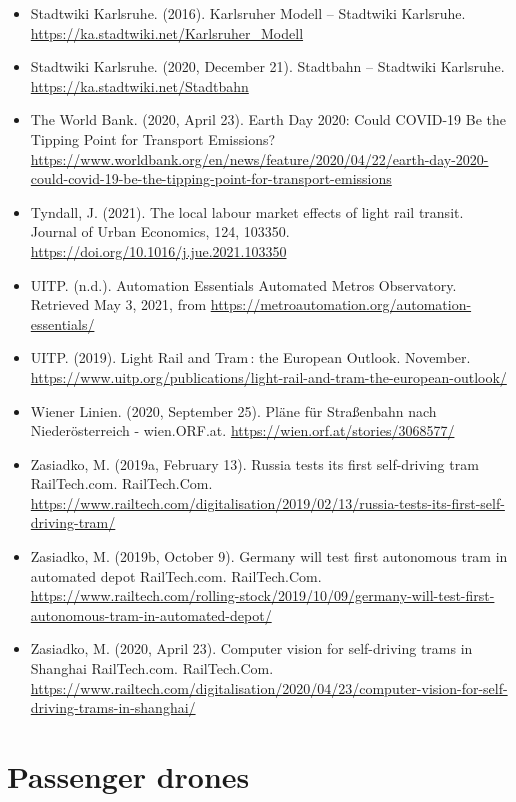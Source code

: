\documentclass[
]{book}
\begin{document}
\begin{itemize}
\item
  Stadtwiki Karlsruhe. (2016). Karlsruher Modell -- Stadtwiki Karlsruhe. \url{https://ka.stadtwiki.net/Karlsruher_Modell}
\item
  Stadtwiki Karlsruhe. (2020, December 21). Stadtbahn -- Stadtwiki Karlsruhe. \url{https://ka.stadtwiki.net/Stadtbahn}
\item
  The World Bank. (2020, April 23). Earth Day 2020: Could COVID-19 Be the Tipping Point for Transport Emissions? \url{https://www.worldbank.org/en/news/feature/2020/04/22/earth-day-2020-could-covid-19-be-the-tipping-point-for-transport-emissions}
\item
  Tyndall, J. (2021). The local labour market effects of light rail transit. Journal of Urban Economics, 124, 103350. \url{https://doi.org/10.1016/j.jue.2021.103350}
\item
  UITP. (n.d.). Automation Essentials \textbar{} Automated Metros Observatory. Retrieved May 3, 2021, from \url{https://metroautomation.org/automation-essentials/}
\item
  UITP. (2019). Light Rail and Tram\,: the European Outlook. November. \url{https://www.uitp.org/publications/light-rail-and-tram-the-european-outlook/}
\item
  Wiener Linien. (2020, September 25). Pläne für Straßenbahn nach Niederösterreich - wien.ORF.at. \url{https://wien.orf.at/stories/3068577/}
\item
  Zasiadko, M. (2019a, February 13). Russia tests its first self-driving tram \textbar{} RailTech.com. RailTech.Com. \url{https://www.railtech.com/digitalisation/2019/02/13/russia-tests-its-first-self-driving-tram/}
\item
  Zasiadko, M. (2019b, October 9). Germany will test first autonomous tram in automated depot \textbar{} RailTech.com. RailTech.Com. \url{https://www.railtech.com/rolling-stock/2019/10/09/germany-will-test-first-autonomous-tram-in-automated-depot/}
\item
  Zasiadko, M. (2020, April 23). Computer vision for self-driving trams in Shanghai \textbar{} RailTech.com. RailTech.Com. \url{https://www.railtech.com/digitalisation/2020/04/23/computer-vision-for-self-driving-trams-in-shanghai/}
\end{itemize}

\hypertarget{passenger_drones}{%
\section{Passenger drones}\label{passenger_drones}}
\end{document}
